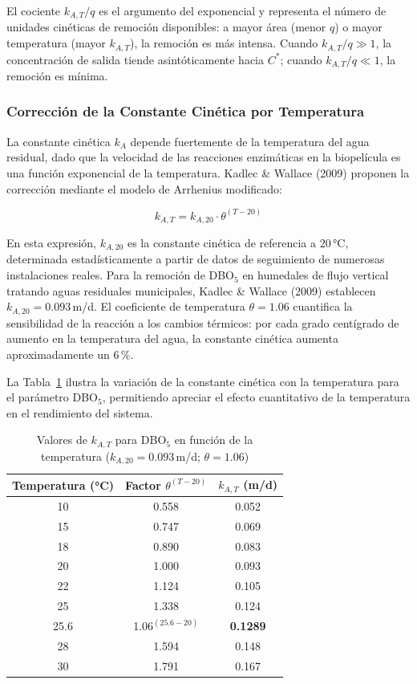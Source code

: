 \documentclass[12pt,a4paper]{article}
\begin{document}
El cociente $k_{A,T}/q$ es el argumento del exponencial y representa el número de unidades cinéticas de remoción disponibles: a mayor área (menor $q$) o mayor temperatura (mayor $k_{A,T}$), la remoción es más intensa. Cuando $k_{A,T}/q \gg 1$, la concentración de salida tiende asintóticamente hacia $C^*$; cuando $k_{A,T}/q \ll 1$, la remoción es mínima.

\subsubsection*{Corrección de la Constante Cinética por Temperatura}

La constante cinética $k_A$ depende fuertemente de la temperatura del agua residual, dado que la velocidad de las reacciones enzimáticas en la biopelícula es una función exponencial de la temperatura. Kadlec \& Wallace (2009) proponen la corrección mediante el modelo de Arrhenius modificado:

\begin{equation}
k_{A,T} = k_{A,20} \cdot \theta^{(T-20)}
\label{eq:arrhenius}
\end{equation}

En esta expresión, $k_{A,20}$ es la constante cinética de referencia a 20\,°C, determinada estadísticamente a partir de datos de seguimiento de numerosas instalaciones reales. Para la remoción de DBO$_5$ en humedales de flujo vertical tratando aguas residuales municipales, Kadlec \& Wallace (2009) establecen $k_{A,20} = 0.093$\,m/d. El coeficiente de temperatura $\theta = 1.06$ cuantifica la sensibilidad de la reacción a los cambios térmicos: por cada grado centígrado de aumento en la temperatura del agua, la constante cinética aumenta aproximadamente un 6\,\%.

La Tabla~\ref{tab:kAT_temperatura} ilustra la variación de la constante cinética con la temperatura para el parámetro DBO$_5$, permitiendo apreciar el efecto cuantitativo de la temperatura en el rendimiento del sistema.

\begin{table}[H]
\centering
\caption{Valores de $k_{A,T}$ para DBO$_5$ en función de la temperatura ($k_{A,20} = 0.093$\,m/d; $\theta = 1.06$)}
\label{tab:kAT_temperatura}
\begin{tabular}{ccc}
\toprule
\textbf{Temperatura (°C)} & \textbf{Factor $\theta^{(T-20)}$} & \textbf{$k_{A,T}$ (m/d)} \\
\midrule
10 & 0.558 & 0.052 \\
15 & 0.747 & 0.069 \\
18 & 0.890 & 0.083 \\
20 & 1.000 & 0.093 \\
22 & 1.124 & 0.105 \\
25 & 1.338 & 0.124 \\
25.6 & 1.06$^{(25.6-20)}$ & \textbf{0.1289} \\
28 & 1.594 & 0.148 \\
30 & 1.791 & 0.167 \\
\bottomrule
\end{tabular}
\end{table}
\end{document}

